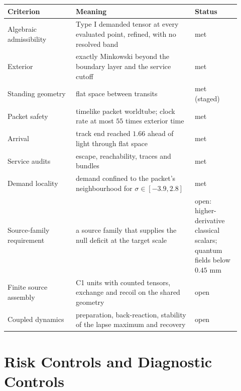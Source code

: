 \documentclass[11pt]{article}
\newcommand{\sig}{\sigma}
\begin{document}
\begin{longtable}{L{0.27\linewidth}L{0.47\linewidth}L{0.18\linewidth}}
\toprule
\textbf{Criterion} & \textbf{Meaning} & \textbf{Status} \\
\midrule
Algebraic admissibility & Type I demanded tensor at every evaluated point, refined, with no resolved band & met \\
Exterior & exactly Minkowski beyond the boundary layer and the service cutoff & met \\
Standing geometry & flat space between transits & met (staged) \\
Packet safety & timelike packet worldtube; clock rate at most $55$ times exterior time & met \\
Arrival & track end reached $1.66$ ahead of light through flat space & met \\
Service audits & escape, reachability, traces and bundles & met \\
Demand locality & demand confined to the packet's neighbourhood for $\sig\in[-3.9,2.8]$ & met \\
Source-family requirement & a source family that supplies the null deficit at the target scale & open: higher-derivative classical scalars; quantum fields below $0.45$ mm \\
Finite source assembly & C1 units with counted tensors, exchange and recoil on the shared geometry & open \\
Coupled dynamics & preparation, back-reaction, stability of the lapse maximum and recovery & open \\
\bottomrule
\end{longtable}

\section{Risk Controls and Diagnostic Controls}
\end{document}
